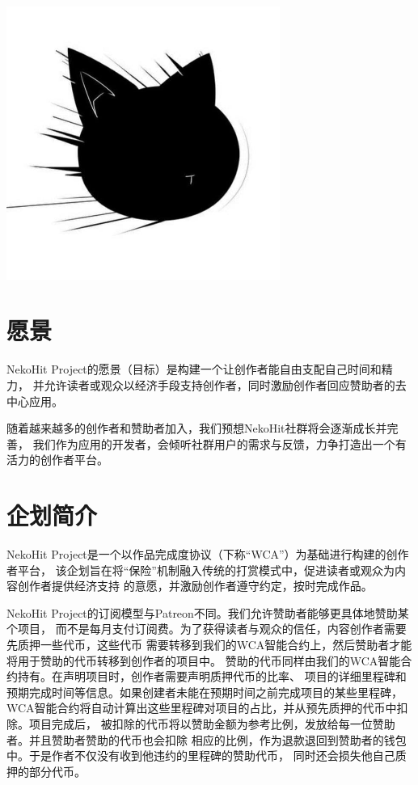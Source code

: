\documentclass[11pt,UTF8,a4paper]{ctexart}
\begin{document}
    \tableofcontents
    \vspace*{\fill}
    \begin{center}
        \includegraphics[width=0.67\textwidth]{assets/img197}
    \end{center}
    \clearpage



    \section{愿景}\label{sec:goal}

    NekoHit Project的愿景（目标）是构建一个让创作者能自由支配自己时间和精力，
    并允许读者或观众以经济手段支持创作者，同时激励创作者回应赞助者的去中心应用。

    随着越来越多的创作者和赞助者加入，我们预想NekoHit社群将会逐渐成长并完善，
    我们作为应用的开发者，会倾听社群用户的需求与反馈，力争打造出一个有活力的创作者平台。


    \section{企划简介}\label{sec:intro}

    NekoHit Project是一个以作品完成度协议（下称“WCA”）为基础进行构建的创作者平台，
    该企划旨在将“保险”机制融入传统的打赏模式中，促进读者或观众为内容创作者提供经济支持
    的意愿，并激励创作者遵守约定，按时完成作品。

    NekoHit Project的订阅模型与Patreon不同。我们允许赞助者能够更具体地赞助某个项目，
    而不是每月支付订阅费。为了获得读者与观众的信任，内容创作者需要先质押一些代币，这些代币
    需要转移到我们的WCA智能合约上，然后赞助者才能将用于赞助的代币转移到创作者的项目中。
    赞助的代币同样由我们的WCA智能合约持有。在声明项目时，创作者需要声明质押代币的比率、
    项目的详细里程碑和预期完成时间等信息。如果创建者未能在预期时间之前完成项目的某些里程碑，
    WCA智能合约将自动计算出这些里程碑对项目的占比，并从预先质押的代币中扣除。项目完成后，
    被扣除的代币将以赞助金额为参考比例，发放给每一位赞助者。并且赞助者赞助的代币也会扣除
    相应的比例，作为退款退回到赞助者的钱包中。于是作者不仅没有收到他违约的里程碑的赞助代币，
    同时还会损失他自己质押的部分代币。
\end{document}
